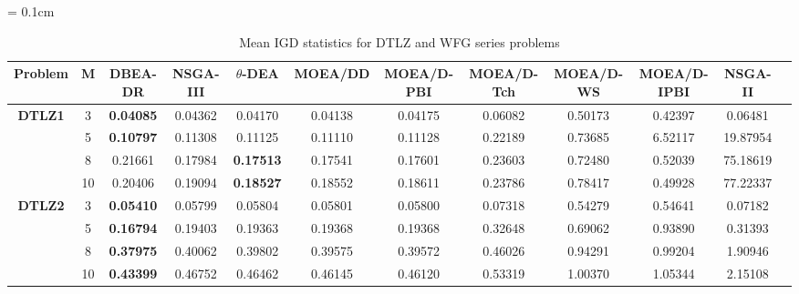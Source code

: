 \documentclass{sig-alternate}
\begin{document}
\begin{table*}[!htb]\scriptsize
	\centering
	\renewcommand{\arraystretch}{0.9}
	\caption{Mean IGD statistics for DTLZ and WFG series problems}
	\label{tab:IGD}
	\tabcolsep = 0.1cm
	\begin{tabular}{|c|c|c|c|c|c|c|c|c|c|c|c|}
		\noalign{\smallskip}\hline
		\textbf{Problem}                & \textbf{M} & \textbf{DBEA-DR} & \textbf{NSGA-III} & \textbf{$\theta$-DEA} & \textbf{MOEA/DD} & \textbf{MOEA/D-PBI} & \textbf{MOEA/D-Tch} & \textbf{MOEA/D-WS} & \textbf{MOEA/D-IPBI} & \textbf{NSGA-II} \\ \hline
		\multirow{4}{*}{\textbf{DTLZ1}} & 3          & \textbf{0.04085} & 0.04362           & 0.04170               & 0.04138          & 0.04175             & 0.06082             & 0.50173            & 0.42397              & 0.06481          \\ \cline{2-11} 
		& 5          & \textbf{0.10797} & 0.11308           & 0.11125               & 0.11110          & 0.11128             & 0.22189             & 0.73685            & 6.52117              & 19.87954         \\ \cline{2-11} 
		& 8          & 0.21661          & 0.17984           & \textbf{0.17513}      & 0.17541          & 0.17601             & 0.23603             & 0.72480            & 0.52039              & 75.18619         \\ \cline{2-11} 
		& 10         & 0.20406          & 0.19094           & \textbf{0.18527}      & 0.18552          & 0.18611             & 0.23786             & 0.78417            & 0.49928              & 77.22337         \\ \hline
		\multirow{4}{*}{\textbf{DTLZ2}} & 3          & \textbf{0.05410} & 0.05799           & 0.05804               & 0.05801          & 0.05800             & 0.07318             & 0.54279            & 0.54641              & 0.07182          \\ \cline{2-11} 
		& 5          & \textbf{0.16794} & 0.19403           & 0.19363               & 0.19368          & 0.19368             & 0.32648             & 0.69062            & 0.93890              & 0.31393          \\ \cline{2-11} 
		& 8          & \textbf{0.37975} & 0.40062           & 0.39802               & 0.39575          & 0.39572             & 0.46026             & 0.94291            & 0.99204              & 1.90946          \\ \cline{2-11} 
		& 10         & \textbf{0.43399} & 0.46752           & 0.46462               & 0.46145          & 0.46120             & 0.53319             & 1.00370            & 1.05344              & 2.15108          \\ \hline

\end{tabular}
\end{table*}
\end{document}
